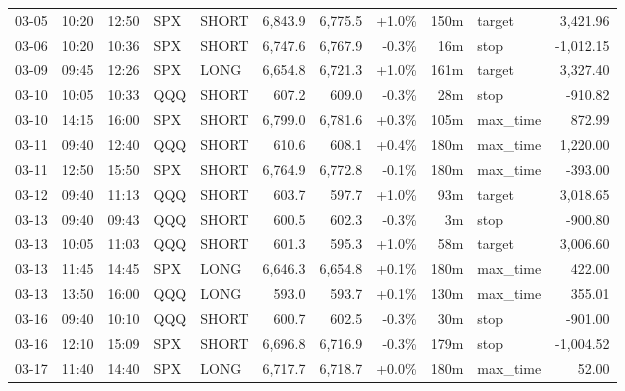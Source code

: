 \documentclass[11pt,a4paper,twoside]{article}
\begin{document}
\begin{center}
\begin{longtable}{>{\color{txtmain}}l l l l l r r r r >{\color{txtmain}}l r}
03-05 & 10:20 & 12:50 & SPX & SHORT & 6,843.9 & 6,775.5 & \textcolor{wingreen}{+1.0\%} & 150m & target & \textcolor{wingreen}{3,421.96} \\
03-06 & 10:20 & 10:36 & SPX & SHORT & 6,747.6 & 6,767.9 & \textcolor{lossred}{-0.3\%} & 16m & stop & \textcolor{lossred}{-1,012.15} \\
03-09 & 09:45 & 12:26 & SPX & LONG & 6,654.8 & 6,721.3 & \textcolor{wingreen}{+1.0\%} & 161m & target & \textcolor{wingreen}{3,327.40} \\
03-10 & 10:05 & 10:33 & QQQ & SHORT & 607.2 & 609.0 & \textcolor{lossred}{-0.3\%} & 28m & stop & \textcolor{lossred}{-910.82} \\
03-10 & 14:15 & 16:00 & SPX & SHORT & 6,799.0 & 6,781.6 & \textcolor{wingreen}{+0.3\%} & 105m & max\_time & \textcolor{wingreen}{872.99} \\
03-11 & 09:40 & 12:40 & QQQ & SHORT & 610.6 & 608.1 & \textcolor{wingreen}{+0.4\%} & 180m & max\_time & \textcolor{wingreen}{1,220.00} \\
03-11 & 12:50 & 15:50 & SPX & SHORT & 6,764.9 & 6,772.8 & \textcolor{lossred}{-0.1\%} & 180m & max\_time & \textcolor{lossred}{-393.00} \\
03-12 & 09:40 & 11:13 & QQQ & SHORT & 603.7 & 597.7 & \textcolor{wingreen}{+1.0\%} & 93m & target & \textcolor{wingreen}{3,018.65} \\
03-13 & 09:40 & 09:43 & QQQ & SHORT & 600.5 & 602.3 & \textcolor{lossred}{-0.3\%} & 3m & stop & \textcolor{lossred}{-900.80} \\
03-13 & 10:05 & 11:03 & QQQ & SHORT & 601.3 & 595.3 & \textcolor{wingreen}{+1.0\%} & 58m & target & \textcolor{wingreen}{3,006.60} \\
03-13 & 11:45 & 14:45 & SPX & LONG & 6,646.3 & 6,654.8 & \textcolor{wingreen}{+0.1\%} & 180m & max\_time & \textcolor{wingreen}{422.00} \\
03-13 & 13:50 & 16:00 & QQQ & LONG & 593.0 & 593.7 & \textcolor{wingreen}{+0.1\%} & 130m & max\_time & \textcolor{wingreen}{355.01} \\
03-16 & 09:40 & 10:10 & QQQ & SHORT & 600.7 & 602.5 & \textcolor{lossred}{-0.3\%} & 30m & stop & \textcolor{lossred}{-901.00} \\
03-16 & 12:10 & 15:09 & SPX & SHORT & 6,696.8 & 6,716.9 & \textcolor{lossred}{-0.3\%} & 179m & stop & \textcolor{lossred}{-1,004.52} \\
03-17 & 11:40 & 14:40 & SPX & LONG & 6,717.7 & 6,718.7 & \textcolor{wingreen}{+0.0\%} & 180m & max\_time & \textcolor{wingreen}{52.00} \\

\end{longtable}
\end{center}
\end{document}
